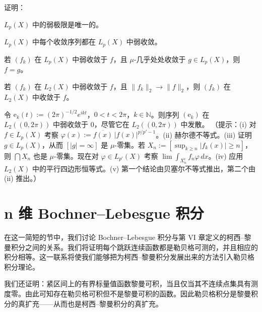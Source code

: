 \begin{exercises}
证明：

\begin{subitems}
\item

$ L_p(X) $ 中的弱极限是唯一的。

\item

$ L_p(X) $ 中每个收敛序列都在 $ L_p(X) $ 中弱收敛。

\item

若 $ (f_k) $ 在 $ L_p(X) $ 中弱收敛于 $ f $，且 $ \mu $-几乎处处收敛于 $ g \in L_p(X) $，则 $ f = g $。

\item

若 $ (f_k) $ 在 $ L_2(X) $ 中弱收敛于 $ f $，且 $ \|f_k\|_2 \to \|f\|_2 $，则 $ (f_k) $ 在 $ L_2(X) $ 中收敛于 $ f $。

\item

令 $ \mathrm{e}_k(t) := (2\pi)^{-1/2} e^{ikt} $，$ 0 < t < 2\pi $，$ k \in \mathbb{N} $。则序列 $ (\mathrm{e}_k) $ 在 $ L_2((0,2\pi)) $ 中弱收敛于 0，尽管它在 $ L_2((0,2\pi)) $ 中发散。
（提示：(i) 对 $ f \in L_p(X) $ 考察 $ \varphi(x) := \overline{f(x)}\,|f(x)|^{p/p'-1} $。(ii) 赫尔德不等式。(iii) 证明 $ g \in L_p(X) $，从而 $ [|g| = \infty] $ 是 $ \mu $-零集。若 $ X_n := [\sup_{k\ge n}|f_k(x)| \ge n] $，则 $ \bigcap X_n $ 也是 $ \mu $-零集。现在对 $ \varphi \in L_{p'}(X) $ 考察 $ \lim\int_{X_n^c} f_n\varphi \, dx $。(iv) 应用 $ L_2(X) $ 中的平行四边形恒等式。(v) 第一个结论由贝塞尔不等式推出，第二个由 (ii) 推出。）

\end{subitems}

\end{exercises}

\section{n 维 Bochner–Lebesgue 积分}

在这一简短的节中，我们讨论 Bochner–Lebesgue 积分与第 VI 章定义的柯西–黎曼积分之间的关系。我们将证明每个跳跃连续函数都是勒贝格可测的，并且相应的积分相等。这一联系将使我们能够把为柯西–黎曼积分发展出来的方法引入勒贝格积分理论。

我们还证明：紧区间上的有界标量值函数黎曼可积，当且仅当其不连续点集具有测度零。由此可知存在勒贝格可积但不是黎曼可积的函数。因此勒贝格积分是黎曼积分的真扩充——从而也是柯西–黎曼积分的真扩充。

